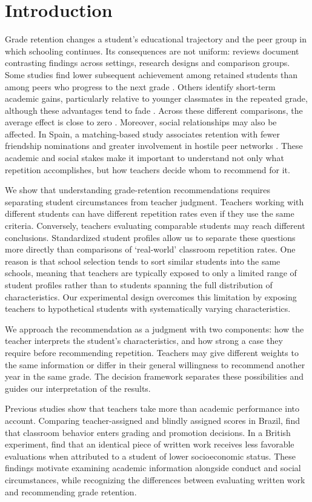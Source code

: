 \section{Introduction}
Grade retention changes a student's educational trajectory and the peer group in which schooling continues. Its consequences are not uniform: reviews document contrasting findings across settings, research designs and comparison groups. Some studies find lower subsequent achievement among retained students than among peers who progress to the next grade \citep{allen,goos}. Others identify short-term academic gains, particularly relative to younger classmates in the repeated grade, although these advantages tend to fade \citep{allen,goos}. Across these different comparisons, the average effect is close to zero \citep{goos}. Moreover, social relationships may also be affected. In Spain, a matching-based study associates retention with fewer friendship nominations and greater involvement in hostile peer networks \citep{branasjorrat}. These academic and social stakes make it important to understand not only what repetition accomplishes, but how teachers decide whom to recommend for it.

We show that understanding grade-retention recommendations requires separating student circumstances from teacher judgment. Teachers working with different students can have different repetition rates even if they use the same criteria. Conversely, teachers evaluating comparable students may reach different conclusions. Standardized student profiles allow us to separate these questions more directly than comparisons of `real-world' classroom repetition rates. One reason is that school selection tends to sort similar students into the same schools, meaning that teachers are typically exposed to only a limited range of student profiles rather than to students spanning the full distribution of characteristics. Our experimental design overcomes this limitation by exposing teachers to hypothetical students with systematically varying characteristics.

We approach the recommendation as a judgment with two components: how the teacher interprets the student's characteristics, and how strong a case they require before recommending repetition. Teachers may give different weights to the same information or differ in their general willingness to recommend another year in the same grade. The decision framework separates these possibilities and guides our interpretation of the results.

Previous studies show that teachers take more than academic performance into account. Comparing teacher-assigned and blindly assigned scores in Brazil, \citet{ferman} find that classroom behavior enters grading and promotion decisions. In a British experiment, \citet{doyle} find that an identical piece of written work receives less favorable evaluations when attributed to a student of lower socioeconomic status. These findings motivate examining academic information alongside conduct and social circumstances, while recognizing the differences between evaluating written work and recommending grade retention.

